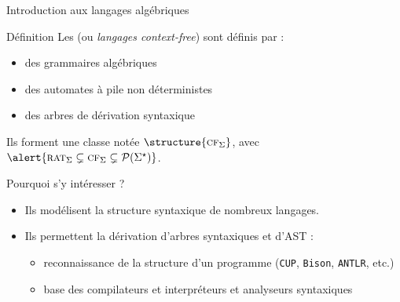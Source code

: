 
\begingroup

\begin{frame}{Introduction aux langages algébriques}

  \begin{block}{Définition}
    Les  (ou \emph{langages context-free}) sont définis par :
    \begin{itemize}
      \item des grammaires algébriques
      \item des automates à pile non déterministes
      \item des arbres de dérivation syntaxique
    \end{itemize}
    Ils forment une classe notée $\structure{\textsc{cf}_\Sigma}$, avec $\alert{\textsc{rat}_\Sigma \subsetneq \textsc{cf}_\Sigma \subsetneq \mathcal{P}(\Sigma^\star)}$.
  \end{block}

  \begin{block}{Pourquoi s'y intéresser ?}
    \begin{itemize}
      \item Ils modélisent la structure syntaxique de nombreux langages.
      \item Ils permettent la dérivation d’arbres syntaxiques et d'AST :
        \begin{itemize}
          \item reconnaissance de la structure d’un programme (\texttt{CUP}, \texttt{Bison}, \texttt{ANTLR}, etc.)
          \item base des compilateurs et interpréteurs et analyseurs syntaxiques
        \end{itemize}
    \end{itemize}
  \end{block}

\end{frame}

\endgroup

